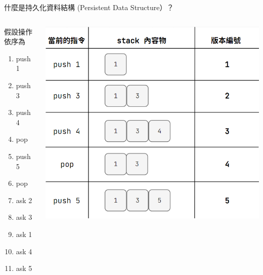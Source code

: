 \documentclass[aspectratio=169]{beamer}
\begin{document}
    \begin{frame}{什麼是持久化資料結構 (Persistent Data Structure）？}
        \begin{columns}
        \begin{column}{0.2\textwidth}
            假設操作依序為
            \begin{enumerate}
                \item push 1
                \item push 3
                \item push 4
                \item pop
                \item push 5
                \item pop
                \item ask 2
                \item ask 3
                \item ask 1
                \item ask 4
                \item ask 5
            \end{enumerate}
        \end{column}
        \begin{column}{0.6\textwidth}
            \begin{center}
                \includegraphics[scale=0.4]{persistent/persistent_stack.png}
            \end{center}
        \end{column}
        \end{columns}
    \end{frame}
\end{document}
